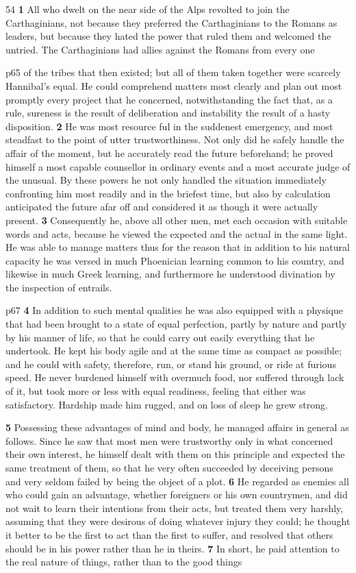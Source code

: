 54
\textbf{1} All who dwelt on the near side of the Alps revolted to join the Carthaginians, not because they preferred the Carthaginians to the Romans as leaders, but because they hated the power that ruled them and welcomed the untried. The Carthaginians had allies against the Romans from every one

p65 of the tribes that then existed; but all of them taken together were scarcely Hannibal's equal. He could comprehend matters most clearly and plan out most promptly every project that he concerned, notwithstanding the fact that, as a rule, sureness is the result of deliberation and instability the result of a hasty disposition. \textbf{2} He was most resource ­ful in the suddenest emergency, and most steadfast to the point of utter trustworthiness. Not only did he safely handle the affair of the moment, but he accurately read the future beforehand; he proved himself a most capable counsellor in ordinary events and a most accurate judge of the unusual. By these powers he not only handled the situation immediately confronting him most readily and in the briefest time, but also by calculation anticipated the future afar off and considered it as though it were actually present. \textbf{3} Consequently he, above all other men, met each occasion with suitable words and acts, because he viewed the expected and the actual in the same light. He was able to manage matters thus for the reason that in addition to his natural capacity he was versed in much Phoenician learning common to his country, and likewise in much Greek learning, and furthermore he understood divination by the inspection of entrails.

p67
\textbf{4}
In addition to such mental qualities he was also equipped with a physique that had been brought to a state of equal perfection, partly by nature and partly by his manner of life, so that he could carry out easily everything that he undertook. He kept his body agile and at the same time as compact as possible; and he could with safety, therefore, run, or stand his ground, or ride at furious speed. He never burdened himself with overmuch food, nor suffered through lack of it, but took more or less with equal readiness, feeling that either was satisfactory. Hardship made him rugged, and on loss of sleep he grew strong.

\textbf{5}
Possessing these advantages of mind and body, he managed affairs in general as follows. Since he saw that most men were trustworthy only in what concerned their own interest, he himself dealt with them on this principle and expected the same treatment of them, so that he very often succeeded by deceiving persons and very seldom failed by being the object of a plot. \textbf{6} He regarded as enemies all who could gain an advantage, whether foreigners or his own countrymen, and did not wait to learn their intentions from their acts, but treated them very harshly, assuming that they were desirous of doing whatever injury they could; he thought it better to be the first to act than the first to suffer, and resolved that others should be in his power rather than he in theirs. \textbf{7} In short, he paid attention to the real nature of things, rather than to the good things


